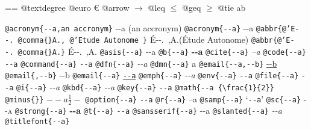 \documentclass{book}
\makeatletter
\newcommand\GNUTexinfocommandstyletextcite[1]{{\normalfont{}\textsl{#1}}}%
\newenvironment{GNUTexinfopreformatted}{%
  \par\obeylines\obeyspaces\frenchspacing
  \parskip=\z@\parindent=\z@}{}
\makeatother
\begin{document}
\begin{GNUTexinfopreformatted}
@textdegree \textdegree{}
@euro \euro{}
@arrow $\rightarrow{}$
@leq $\leq{}$
@geq $\geq{}$
@tie a\hbox{}b

\texttt{@acronym\{{-}{-}a,an accronym\}} {-}{-}a (an accronym)
\texttt{@acronym\{{-}{-}a\}} {-}{-}a
\texttt{@abbr\{@'E{-}{-}.\ @comma\{\}A.,\ @'Etude Autonome \}} \'{E}{-}{-}.\@\ ,A.\@ (\'{E}tude Autonome)
\texttt{@abbr\{@'E{-}{-}.\ @comma\{\}A.\}} \'{E}{-}{-}.\@\ ,A.\@
\texttt{@asis\{{-}{-}a\}} {-}{-}a
\texttt{@b\{{-}{-}a\}} \textbf{{-}{-}a}
\texttt{@cite\{{-}{-}a\}} \GNUTexinfocommandstyletextcite{--a}
\texttt{@code\{{-}{-}a\}} \texttt{{-}{-}a}
\texttt{@command\{{-}{-}a\}} \texttt{{-}{-}a}
\texttt{@dfn\{{-}{-}a\}} \textsl{{-}{-}a}
\texttt{@dmn\{{-}{-}a\}} \thinspace {-}{-}a
\texttt{@email\{{-}{-}a,{-}{-}b\}} \href{mailto:--a}{{-}{-}b}
\texttt{@email\{,{-}{-}b\}} {-}{-}b
\texttt{@email\{{-}{-}a\}} \href{mailto:--a}{\nolinkurl{--a}}
\texttt{@emph\{{-}{-}a\}} \emph{{-}{-}a}
\texttt{@env\{{-}{-}a\}} \texttt{{-}{-}a}
\texttt{@file\{{-}{-}a\}} \texttt{{-}{-}a}
\texttt{@i\{{-}{-}a\}} \textit{{-}{-}a}
\texttt{@kbd\{{-}{-}a\}} {\ttfamily\textsl{{-}{-}a}}
\texttt{@key\{{-}{-}a\}} \texttt{{-}{-}a}
\texttt{@math\{{-}{-}a \{\textbackslash{}frac\{1\}\{2\}\} @minus\{\}\}} $--a {\frac{1}{2}} -$
\texttt{@option\{{-}{-}a\}} \texttt{{-}{-}a}
\texttt{@r\{{-}{-}a\}} \textnormal{--a}
\texttt{@samp\{{-}{-}a\}} `\texttt{{-}{-}a}'
\texttt{@sc\{{-}{-}a\}} \textsc{{-}{-}a}
\texttt{@strong\{{-}{-}a\}} \textbf{{-}{-}a}
\texttt{@t\{{-}{-}a\}} \texttt{{-}{-}a}
\texttt{@sansserif\{{-}{-}a\}} \textsf{{-}{-}a}
\texttt{@slanted\{{-}{-}a\}} \textsl{{-}{-}a}
\texttt{@titlefont\{{-}{-}a\}} \end{GNUTexinfopreformatted}
\end{document}
